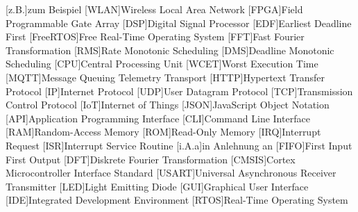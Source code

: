 \documentclass[../EDF Master Thesis.tex]{subfiles}
\begin{document}
    \begin{acronym}[abkuerzungen]
        [z.B.]{zum Beispiel}
        [WLAN]{Wireless Local Area Network}
        [FPGA]{Field Programmable Gate Array}
        [DSP]{Digital Signal Processor}
        [EDF]{Earliest Deadline First}
        [FreeRTOS]{Free Real-Time Operating System}
        [FFT]{Fast Fourier Transformation}
        [RMS]{Rate Monotonic Scheduling}
        [DMS]{Deadline Monotonic Scheduling}
        [CPU]{Central Processing Unit}
        [WCET]{Worst Execution Time}
        [MQTT]{Message Queuing Telemetry Transport}
        [HTTP]{Hypertext Transfer Protocol}
        [IP]{Internet Protocol}
        [UDP]{User Datagram Protocol}
        [TCP]{Transmission Control Protocol}
        [IoT]{Internet of Things}
        [JSON]{JavaScript Object Notation}
        [API]{Application Programming Interface}
        [CLI]{Command Line Interface}
        [RAM]{Random-Access Memory}
        [ROM]{Read-Only Memory}
        [IRQ]{Interrupt Request}
        [ISR]{Interrupt Service Routine}
        [i.A.a]{in Anlehnung an}
        [FIFO]{First Input First Output}
        [DFT]{Diskrete Fourier Transformation}
        [CMSIS]{Cortex Microcontroller Interface Standard}
        [USART]{Universal Asynchronous Receiver Transmitter}
        [LED]{Light Emitting Diode}
        [GUI]{Graphical User Interface}
        [IDE]{Integrated Development Environment}
        [RTOS]{Real-Time Operating System}
	\end{acronym}
\end{document}

